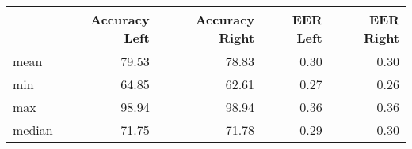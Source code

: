 \begin{tabular}{lrrrr}
\toprule
{} &  Accuracy Left &  Accuracy Right &  EER Left &  EER Right \\
\midrule
mean   &          79.53 &           78.83 &      0.30 &       0.30 \\
min    &          64.85 &           62.61 &      0.27 &       0.26 \\
max    &          98.94 &           98.94 &      0.36 &       0.36 \\
median &          71.75 &           71.78 &      0.29 &       0.30 \\
\bottomrule
\end{tabular}

